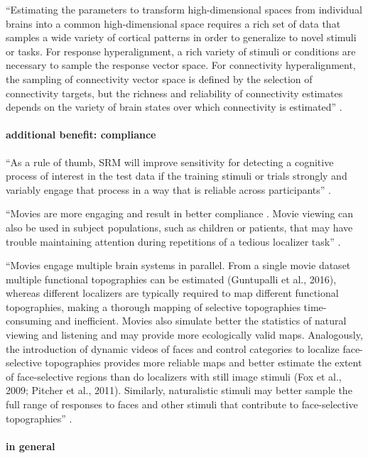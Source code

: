 ``Estimating the parameters to transform high-dimensional spaces from individual
brains into a common high-dimensional space requires a rich set of data that
samples a wide variety of cortical patterns in order to generalize to novel
stimuli or tasks. For response hyperalignment, a rich variety of stimuli or
conditions are necessary to sample the response vector space. For connectivity
hyperalignment, the sampling of connectivity vector space is defined by the
selection of connectivity targets, but the richness and reliability of
connectivity estimates depends on the variety of brain states over which
connectivity is estimated'' \citep{haxby2020hyperalignment}.


\paragraph{additional benefit: compliance}
%
``As a rule of thumb, SRM will improve sensitivity for detecting a cognitive
process of interest in the test data if the training stimuli or trials strongly
and variably engage that process in a way that is reliable across participants''
\citep{cohen2017computational}.

%
``Movies are more engaging and result in better compliance
\citep{vanderwal2015inscapes}. Movie viewing can also be used in subject
populations, such as children \citep{richardson2018development} or patients,
that may have trouble maintaining attention during repetitions of a tedious
localizer task'' \citep{jiahui2020predicting}.

%
``Movies engage multiple brain systems in parallel. From a single movie dataset
multiple functional topographies can be estimated (Guntupalli et al., 2016),
whereas different localizers are typically required to map different functional
topographies, making a thorough mapping of selective topographies
time-consuming and inefficient. Movies also simulate better the statistics of
natural viewing and listening and may provide more ecologically valid maps.
Analogously, the introduction of dynamic videos of faces and control categories
to localize face-selective topographies provides more reliable maps and better
estimate the extent of face-selective regions than do localizers with still
image stimuli (Fox et al., 2009; Pitcher et al., 2011). Similarly, naturalistic
stimuli may better sample the full range of responses to faces and other stimuli
that contribute to face-selective topographies'' \citep{jiahui2020predicting}.

\paragraph{in general}


